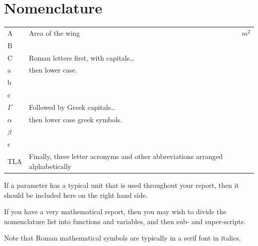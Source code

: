 \documentclass[a4paper,oneside,12pt]{book}
\begin{document}
\section*{\Huge{Nomenclature}}
\begin{tabular}{lp{9cm}l}
A&Area of the wing&$m^{2}$\\
B\\
C& Roman letters first, with capitals\ldots\\
a&then lower case.\\
b\\
c\\
$\Gamma$&Followed by Greek capitals\ldots\\
$\alpha$&then lower case greek symbols.\\
$\beta$\\
$\epsilon$\\
TLA&Finally, three letter acronyms and other abbreviations arranged alphabetically\\
\end{tabular}
\vspace{2cm}

If a parameter has a typical unit that is used throughout your report, then it should be included here on the right hand side.

If you have a very mathematical report, then you may wish to divide the nomenclature list into functions and variables, and then sub- and super-scripts.

Note that Roman mathematical symbols are typically in a serif font in italics.

\mainmatter








\appendix
\renewcommand{\thechapter}{A\arabic{chapter}}

\end{document}
